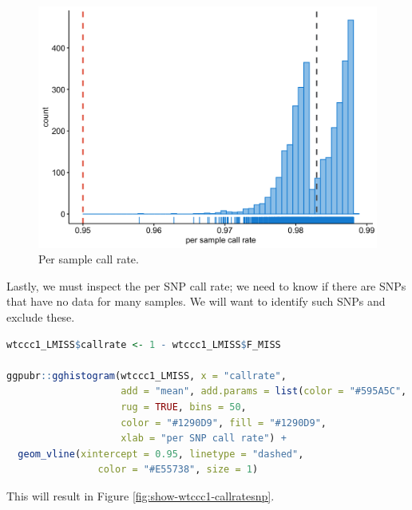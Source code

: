 \documentclass[
]{book}
\begin{document}
\begin{figure}

{\centering \includegraphics[width=18.67in]{img/_gwas/WTCCC1 callrate samples} 

}

\caption{Per sample call rate.}\label{fig:show-wtccc1-callratesample}
\end{figure}

Lastly, we must inspect the per SNP call rate; we need to know if there are SNPs that have no data for many samples. We will want to identify such SNPs and exclude these.

\begin{lstlisting}[language=R]
wtccc1_LMISS$callrate <- 1 - wtccc1_LMISS$F_MISS

ggpubr::gghistogram(wtccc1_LMISS, x = "callrate",
                    add = "mean", add.params = list(color = "#595A5C", linetype = "dashed", size = 1),
                    rug = TRUE, bins = 50,
                    color = "#1290D9", fill = "#1290D9",
                    xlab = "per SNP call rate") +
  geom_vline(xintercept = 0.95, linetype = "dashed",
                color = "#E55738", size = 1)
\end{lstlisting}

This will result in Figure \ref{fig:show-wtccc1-callratesnp}.
\end{document}
